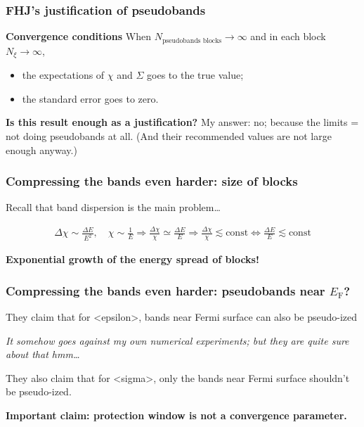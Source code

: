 \documentclass[t]{beamer}
\newcommand{\shortcode}[1]{\texttt{#1}}
\newcommand*{\const}{\text{const}}
\def\\{}%
\def\texttt#1{<#1>}%
\begin{document}
\begin{frame}
\frametitle{FHJ's justification of pseudobands}

\textbf{Convergence conditions} When $N_{\text{pseudobands blocks}} \to \infty$ and in each block $N_\xi \to \infty$, 
\begin{itemize}
    \item the expectations of $\chi$ and $\Sigma$ goes to the true value;
    \item the standard error goes to zero.
\end{itemize}

\textbf{Is this result enough as a justification?} My answer: no; 
because the limits = not doing pseudobands at all. 
(And their recommended values are not large enough anyway.)


\end{frame}

\begin{frame}
\frametitle{Compressing the bands even harder: size of blocks}

Recall that band dispersion is the main problem\dots

\[
    \begin{aligned}
        \Delta \chi \sim \frac{\Delta E}{E^2}, \quad \chi \sim \frac{1}{E} \Rightarrow
        \frac{\Delta \chi}{\chi} \simeq \frac{\Delta E}{E} \\
        \Rightarrow
        \frac{\Delta \chi}{\chi} \lesssim \const \Leftrightarrow \boxed{\frac{\Delta E}{E} \lesssim \const}
    \end{aligned}
\]

\textbf{Exponential growth of the energy spread of blocks!}

\end{frame}

\begin{frame}
\frametitle{Compressing the bands even harder: pseudobands near $E_{\text{F}}$?}

They claim that for \shortcode{epsilon}, 
bands near Fermi surface can also be pseudo-ized 

\emph{It somehow goes against my own numerical experiments; but they are quite sure about that hmm\dots}

They also claim that for \shortcode{sigma}, only the bands near Fermi surface shouldn't be pseudo-ized.

\textbf{Important claim: protection window is not a convergence parameter.} 

\end{frame}
\end{document}

